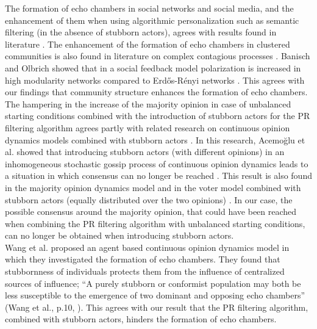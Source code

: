 \documentclass[11 pt , letterpaper , twoside , openright]{book}
\begin{document}
\newline
The formation of echo chambers in social networks and social media, and the enhancement of them when using algorithmic personalization such as semantic filtering (in the absence of stubborn actors), agrees with results found in literature \cite{Baumann2019}\cite{Cinelli2020}\cite{Nikolov2015}\cite{Sirbu2018}. The enhancement of the formation of echo chambers in clustered communities is also found in literature on complex contagious processes \cite{Becker2017}. Banisch and Olbrich showed that in a social feedback model polarization is increased in high modularity networks compared to Erd\H{o}s-R\'{e}nyi networks \cite{Banisch2018}. This agrees with our findings that community structure enhances the formation of echo chambers.\\
\newline
The hampering in the increase of the majority opinion in case of unbalanced starting conditions combined with the introduction of stubborn actors for the PR filtering algorithm agrees partly with related research on continuous opinion dynamics models combined with stubborn actors \cite{Como2013}. In this research, Acemo\u{g}lu et al. showed that introducing stubborn actors (with different opinions) in an inhomogeneous stochastic gossip process of continuous opinion dynamics leads to a situation in which consensus can no longer be reached \cite{Como2013}. This result is also found in the majority opinion dynamics model and in the voter model combined with stubborn actors (equally distributed over the two opinions) \cite{Galam2007}\cite{Mobilia2007}\cite{Yildiz2013}. In our case, the possible consensus around the majority opinion, that could have been reached when combining the PR filtering algorithm with unbalanced starting conditions, can no longer be obtained when introducing stubborn actors.\\
\newline
Wang et al. \cite{Wang2020} proposed an agent based continuous opinion dynamics model in which they investigated the formation of echo chambers. They found that stubbornness of individuals protects them from the
influence of centralized sources of influence; ``A purely stubborn or conformist
population may both be less susceptible to the emergence of
two dominant and opposing echo chambers'' (Wang et al., p.10, \cite{Wang2020}). This agrees with our result that the PR filtering algorithm, combined with stubborn actors, hinders the formation of echo chambers.\\
\newline
\end{document}
